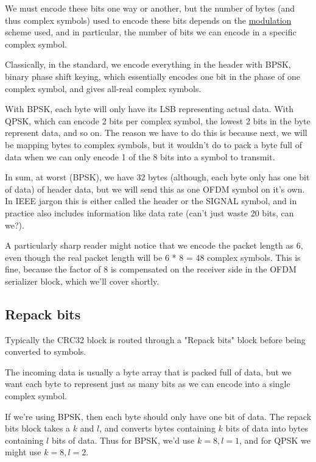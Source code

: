 \documentclass[11pt]{article}
\begin{document}
We must encode these bits one way or another, but the number of bytes
(and thus complex symbols) used to encode these bits depends on the
\href{https://notes.esrh.me/linear\_modulation.html}{modulation} scheme used, and in particular, the number of bits we can
encode in a specific complex symbol.

Classically, in the standard, we encode everything in the header with
BPSK, binary phase shift keying, which essentially encodes one bit in
the phase of one complex symbol, and gives all-real complex symbols.

With BPSK, each byte will only have its LSB representing actual
data. With QPSK, which can encode 2 bits per complex symbol, the
lowest 2 bits in the byte represent data, and so on. The reason we
have to do this is because next, we will be mapping bytes to complex
symbols, but it wouldn't do to pack a byte full of data when we can
only encode 1 of the 8 bits into a symbol to transmit.

In sum, at worst (BPSK), we have 32 bytes (although, each byte only
has one bit of data) of header data, but we will send this as one OFDM
symbol on it's own. In IEEE jargon this is either called the header or
the SIGNAL symbol, and in practice also includes information like data
rate (can't just waste 20 bits, can we?).

A particularly sharp reader might notice that we encode the packet
length as 6, even though the real packet length will be 6 * 8 = 48
complex symbols. This is fine, because the factor of 8 is compensated
on the receiver side in the OFDM serializer block, which we'll cover
shortly.

\subsection{Repack bits}
\label{sec:org47525ff}

Typically the CRC32 block is routed through a "Repack bits" block
before being converted to symbols.

The incoming data is usually a byte array that is packed full of data,
but we want each byte to represent just as many bits as we can encode
into a single complex symbol.

If we're using BPSK, then each byte should only have one bit of
data. The repack bits block takes a \(k\) and \(l\), and converts bytes
containing \(k\) bits of data into bytes containing \(l\) bits of
data. Thus for BPSK, we'd use \(k = 8, l = 1\), and for QPSK we might
use \(k = 8, l = 2\).
\end{document}

